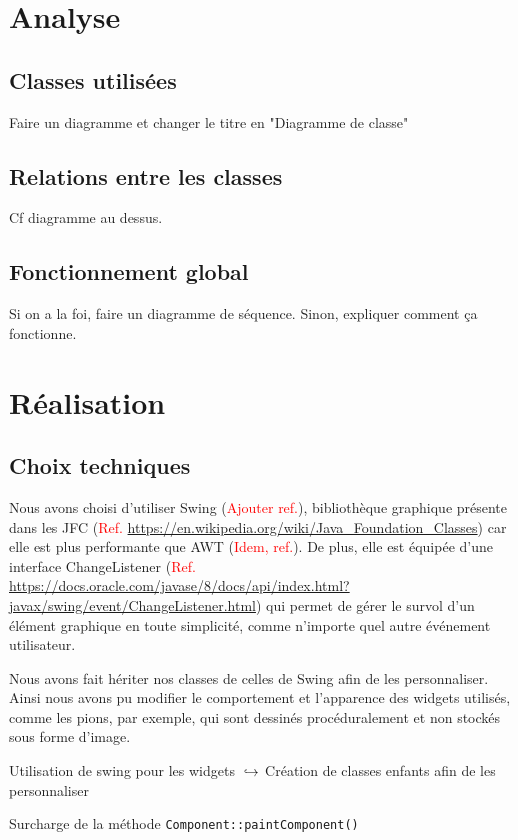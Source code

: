 \documentclass[12pt]{article}
\newcommand\todo[1]{\textcolor{red}{#1}}
\begin{document}
\section{Analyse}
	\subsection{Classes utilisées}
	Faire un diagramme et changer le titre en "Diagramme de classe"

	\subsection{Relations entre les classes}
	Cf diagramme au dessus.

	\subsection{Fonctionnement global}
	Si on a la foi, faire un diagramme de séquence. Sinon, expliquer comment ça fonctionne.

\section{Réalisation}
	\subsection{Choix techniques}
	Nous avons choisi d'utiliser Swing (\todo{Ajouter ref.}), bibliothèque graphique présente dans les JFC (\todo{Ref. \url{https://en.wikipedia.org/wiki/Java_Foundation_Classes}}) car elle est plus performante que AWT (\todo{Idem, ref.}). De plus, elle est équipée d'une interface ChangeListener (\todo{Ref. \url{https://docs.oracle.com/javase/8/docs/api/index.html?javax/swing/event/ChangeListener.html}}) qui permet de gérer le survol d'un élément graphique en toute simplicité, comme n'importe quel autre événement utilisateur.

	Nous avons fait hériter nos classes de celles de Swing afin de les personnaliser. Ainsi nous avons pu modifier le comportement et l'apparence des widgets utilisés, comme les pions, par exemple, qui sont dessinés procéduralement et non stockés sous forme d'image.

	Utilisation de swing pour les widgets
	$\newline\hookrightarrow$
	Création de classes enfants afin de les personnaliser

	Surcharge de la méthode \texttt{Component::paintComponent()}
\end{document}
